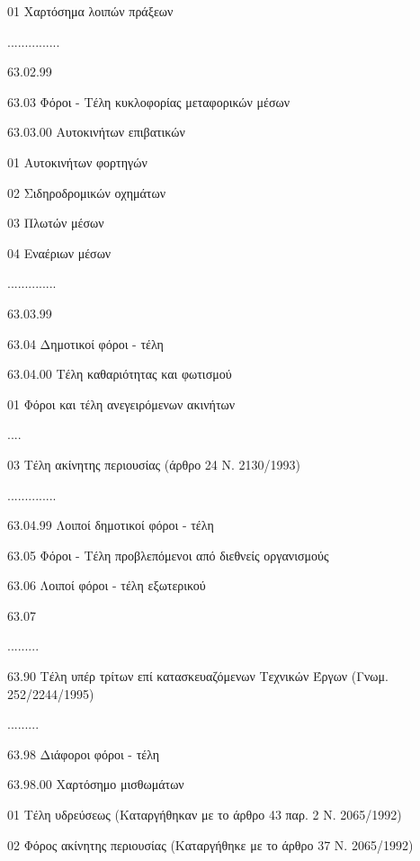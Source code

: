 \documentclass[A4,10pt,greek]{book}
\begin{document}
                              01   Χαρτόσημα λοιπών πράξεων

                    ...............

                    63.02.99

        63.03   Φόροι - Τέλη κυκλοφορίας μεταφορικών μέσων

                    63.03.00    Αυτοκινήτων επιβατικών

                              01   Αυτοκινήτων φορτηγών

                              02   Σιδηροδρομικών οχημάτων

                              03   Πλωτών μέσων

                              04   Εναέριων μέσων

                    ..............

                    63.03.99

        63.04   Δημοτικοί φόροι - τέλη

                    63.04.00   Τέλη καθαριότητας και φωτισμού

                              01   Φόροι και τέλη ανεγειρόμενων ακινήτων

                              ....

                              03   Τέλη ακίνητης περιουσίας (άρθρο 24 Ν. 2130/1993)

                    ..............

                    63.04.99   Λοιποί δημοτικοί φόροι - τέλη

        63.05   Φόροι - Τέλη προβλεπόμενοι από διεθνείς οργανισμούς

        63.06   Λοιποί φόροι - τέλη εξωτερικού

        63.07

        .........

        63.90   Τέλη υπέρ τρίτων επί κατασκευαζόμενων Τεχνικών Έργων
                     (Γνωμ. 252/2244/1995)

        .........

        63.98   Διάφοροι φόροι - τέλη

                    63.98.00   Χαρτόσημο μισθωμάτων

                              01   Τέλη υδρεύσεως
                                      (Καταργήθηκαν με το άρθρο 43 παρ. 2 Ν. 2065/1992)

                              02   Φόρος ακίνητης περιουσίας
                                      (Καταργήθηκε με το άρθρο 37 Ν. 2065/1992)
\end{document}
